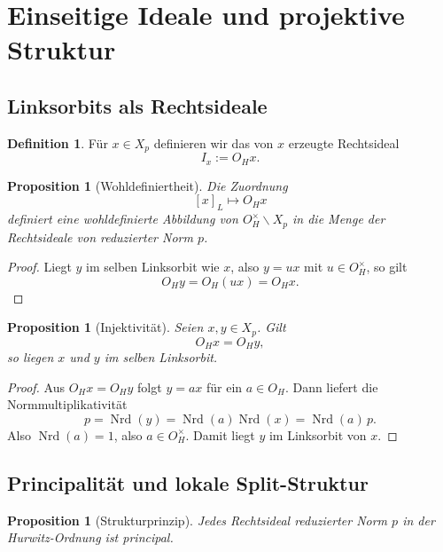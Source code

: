 \documentclass[a4paper,12pt]{article}
\newtheorem{proposition}[satz]{Proposition}
\theoremstyle{definition}
\newtheorem{definition}[satz]{Definition}
\numberwithin{equation}{section}
\newcommand{\OH}{O_H}
\newcommand{\Nrd}{\operatorname{Nrd}}
\begin{document}
	\section{Einseitige Ideale und projektive Struktur}
	
	\subsection{Linksorbits als Rechtsideale}
	
	\begin{definition}
		Für \(x\in X_p\) definieren wir das von \(x\) erzeugte Rechtsideal
		\[
		I_x:=\OH x.
		\]
	\end{definition}
	
	\begin{proposition}[Wohldefiniertheit]
		Die Zuordnung
		\[
		[x]_L\longmapsto \OH x
		\]
		definiert eine wohldefinierte Abbildung von \(\OH^\times\backslash X_p\) in die Menge der Rechtsideale von reduzierter Norm \(p\).
	\end{proposition}
	
	\begin{proof}
		Liegt \(y\) im selben Linksorbit wie \(x\), also \(y=ux\) mit \(u\in \OH^\times\), so gilt
		\[
		\OH y=\OH(ux)=\OH x.
		\]
	\end{proof}
	
	\begin{proposition}[Injektivität]
		Seien \(x,y\in X_p\). Gilt
		\[
		\OH x=\OH y,
		\]
		so liegen \(x\) und \(y\) im selben Linksorbit.
	\end{proposition}
	
	\begin{proof}
		Aus \(\OH x=\OH y\) folgt \(y=ax\) für ein \(a\in \OH\). Dann liefert die Normmultiplikativität
		\[
		p=\Nrd(y)=\Nrd(a)\Nrd(x)=\Nrd(a)\,p.
		\]
		Also \(\Nrd(a)=1\), also \(a\in \OH^\times\). Damit liegt \(y\) im Linksorbit von \(x\).
	\end{proof}
	
	\subsection{Principalität und lokale Split-Struktur}
	
	\begin{proposition}[Strukturprinzip]
		Jedes Rechtsideal reduzierter Norm \(p\) in der Hurwitz-Ordnung ist principal.
	\end{proposition}
	
\end{document}
